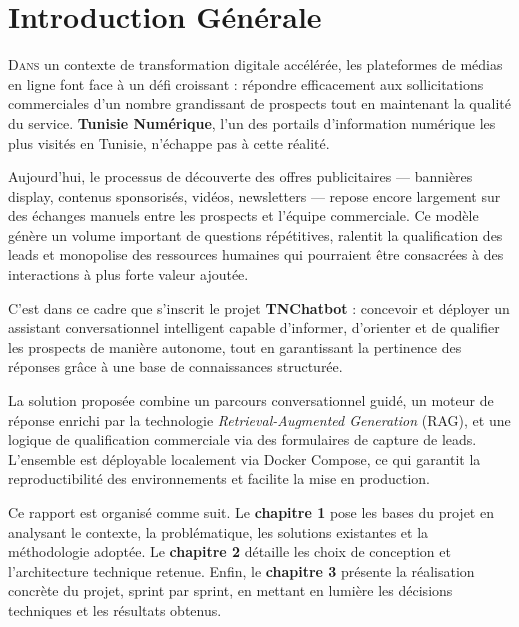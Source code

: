 \documentclass[12pt,a4paper]{report}
\begin{document}
\setcounter{page}{1}

\chapter*{Introduction Générale}

\lettrine[lines=2]{D}{ans} un contexte de transformation digitale accélérée, les plateformes
de médias en ligne font face à un défi croissant : répondre efficacement aux sollicitations
commerciales d'un nombre grandissant de prospects tout en maintenant la qualité du service.
\textbf{Tunisie Numérique}, l'un des portails d'information numérique les plus visités en
Tunisie, n'échappe pas à cette réalité.

Aujourd'hui, le processus de découverte des offres publicitaires — bannières display,
contenus sponsorisés, vidéos, newsletters — repose encore largement sur des échanges manuels
entre les prospects et l'équipe commerciale. Ce modèle génère un volume important de
questions répétitives, ralentit la qualification des leads et monopolise des ressources humaines
qui pourraient être consacrées à des interactions à plus forte valeur ajoutée.

C'est dans ce cadre que s'inscrit le projet \textbf{TNChatbot} : concevoir et déployer un
assistant conversationnel intelligent capable d'informer, d'orienter et de qualifier les prospects
de manière autonome, tout en garantissant la pertinence des réponses grâce à une base de
connaissances structurée.

La solution proposée combine un parcours conversationnel guidé, un moteur de réponse
enrichi par la technologie \textit{Retrieval-Augmented Generation} (RAG), et une logique de
qualification commerciale via des formulaires de capture de leads. L'ensemble est déployable
localement via Docker Compose, ce qui garantit la reproductibilité des environnements et
facilite la mise en production.

Ce rapport est organisé comme suit. Le \textbf{chapitre 1} pose les bases du projet en
analysant le contexte, la problématique, les solutions existantes et la méthodologie adoptée.
Le \textbf{chapitre 2} détaille les choix de conception et l'architecture technique retenue.
Enfin, le \textbf{chapitre 3} présente la réalisation concrète du projet, sprint par sprint, en
mettant en lumière les décisions techniques et les résultats obtenus.
\end{document}
